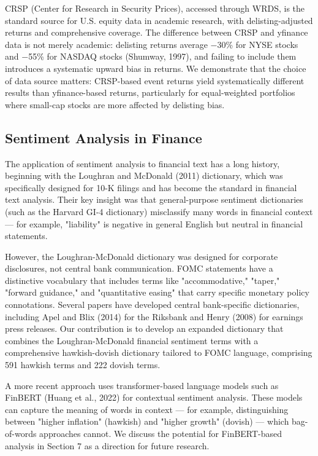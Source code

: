 \documentclass[12pt]{article}
\begin{document}
CRSP (Center for Research in Security Prices), accessed through WRDS, is the standard source for U.S. equity data in academic research, with delisting-adjusted returns and comprehensive coverage. The difference between CRSP and yfinance data is not merely academic: delisting returns average $-$30\% for NYSE stocks and $-$55\% for NASDAQ stocks (Shumway, 1997), and failing to include them introduces a systematic upward bias in returns. We demonstrate that the choice of data source matters: CRSP-based event returns yield systematically different results than yfinance-based returns, particularly for equal-weighted portfolios where small-cap stocks are more affected by delisting bias.

\subsection{Sentiment Analysis in Finance}

The application of sentiment analysis to financial text has a long history, beginning with the Loughran and McDonald (2011) dictionary, which was specifically designed for 10-K filings and has become the standard in financial text analysis. Their key insight was that general-purpose sentiment dictionaries (such as the Harvard GI-4 dictionary) misclassify many words in financial context --- for example, "liability" is negative in general English but neutral in financial statements.

However, the Loughran-McDonald dictionary was designed for corporate disclosures, not central bank communication. FOMC statements have a distinctive vocabulary that includes terms like "accommodative," "taper," "forward guidance," and "quantitative easing" that carry specific monetary policy connotations. Several papers have developed central bank-specific dictionaries, including Apel and Blix (2014) for the Riksbank and Henry (2008) for earnings press releases. Our contribution is to develop an expanded dictionary that combines the Loughran-McDonald financial sentiment terms with a comprehensive hawkish-dovish dictionary tailored to FOMC language, comprising 591 hawkish terms and 222 dovish terms.

A more recent approach uses transformer-based language models such as FinBERT (Huang et al., 2022) for contextual sentiment analysis. These models can capture the meaning of words in context --- for example, distinguishing between "higher inflation" (hawkish) and "higher growth" (dovish) --- which bag-of-words approaches cannot. We discuss the potential for FinBERT-based analysis in Section 7 as a direction for future research.
\end{document}
